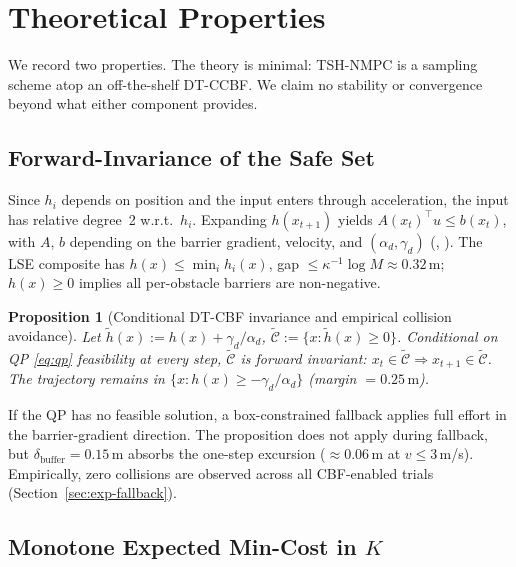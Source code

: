 \documentclass[11pt,onecolumn,a4paper]{article}
\newtheorem{proposition}{Proposition}
\begin{document}
\section{Theoretical Properties}\label{sec:theory}

We record two properties. The theory is minimal: TSH-NMPC is a
sampling scheme atop an off-the-shelf DT-CCBF. We claim no stability
or convergence beyond what either component provides.

\subsection{Forward-Invariance of the Safe Set}

Since $h_i$ depends on position and the input enters through acceleration,
the input has relative degree~2 w.r.t.\ $h_i$. Expanding $h(x_{t+1})$
yields $A(x_t)^\top u \le b(x_t)$, with $A$, $b$ depending on the
barrier gradient, velocity, and $(\alpha_d, \gamma_d)$
(\cite[Thm.~1]{WAN17}, \cite[\S IV]{AME17}). The LSE composite
has $h(x) \le \min_i h_i(x)$, gap $\le \kappa^{-1}\log M \approx
0.32\,\mathrm{m}$; $h(x) \ge 0$ implies all per-obstacle barriers are
non-negative.

\begin{proposition}[Conditional DT-CBF invariance and empirical collision avoidance]
\label{prop:safety}
Let $\tilde h(x) := h(x) + \gamma_d/\alpha_d$,
$\tilde{\mathcal C} := \{x : \tilde h(x) \ge 0\}$.
\emph{Conditional on QP \eqref{eq:qp} feasibility at every step,}
$\tilde{\mathcal C}$ is forward invariant:
$x_t \in \tilde{\mathcal C} \Rightarrow x_{t+1} \in \tilde{\mathcal C}$.
The trajectory remains in $\{x : h(x) \ge -\gamma_d/\alpha_d\}$
(margin $= 0.25\,\mathrm{m}$).
\end{proposition}

If the QP has no feasible solution, a box-constrained fallback applies full
effort in the barrier-gradient direction. The proposition does not
apply during fallback, but $\delta_{\mathrm{buffer}} = 0.15\,\mathrm{m}$
absorbs the one-step excursion (${\approx}0.06\,\mathrm{m}$ at $v \le 3\,\mathrm{m}$/s).
Empirically, zero collisions are observed across all CBF-enabled
trials (Section~\ref{sec:exp-fallback}).

\subsection{Monotone Expected Min-Cost in $K$}
\end{document}
